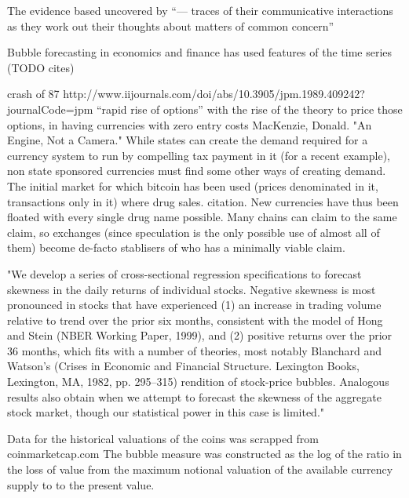 The evidence based uncovered by “— traces of their communicative interactions as they work out their thoughts about matters of common concern” 


Bubble forecasting in economics and finance has used features of the time series (TODO cites)


crash of 87 http://www.iijournals.com/doi/abs/10.3905/jpm.1989.409242?journalCode=jpm “rapid rise of options” with the rise of the theory to price those options, in having currencies with zero entry costs
MacKenzie, Donald. "An Engine, Not a Camera."
While states can create the demand required for a currency system to run by compelling tax payment in it (for a recent example), non state sponsored currencies must find some other ways of creating demand.
The initial market for which bitcoin has been used (prices denominated in it, transactions only in it) where drug sales. citation.
New currencies have thus been floated with every single drug name possible. Many chains can claim to the same claim, so exchanges (since speculation is the only possible use of almost all of them) become de-facto stablisers of who has a minimally viable claim. 


"We develop a series of cross-sectional regression specifications to forecast skewness in the daily returns of individual stocks. Negative skewness is most pronounced in stocks that have experienced (1) an increase in trading volume relative to trend over the prior six months, consistent with the model of Hong and Stein (NBER Working Paper, 1999), and (2) positive returns over the prior 36 months, which fits with a number of theories, most notably Blanchard and Watson's (Crises in Economic and Financial Structure. Lexington Books, Lexington, MA, 1982, pp. 295–315) rendition of stock-price bubbles. Analogous results also obtain when we attempt to forecast the skewness of the aggregate stock market, though our statistical power in this case is limited."






Data for the historical valuations of the coins was scrapped from coinmarketcap.com The bubble measure was constructed as the log of the ratio in the loss of value from the maximum notional valuation of the available currency supply to to the present value. 

